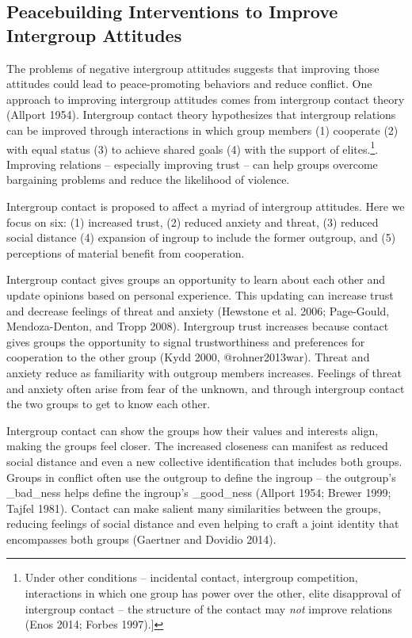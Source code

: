 \documentclass[11pt]{article}
\begin{document}
\hypertarget{peacebuilding-interventions-to-improve-intergroup-attitudes}{%
\subsection{Peacebuilding Interventions to Improve Intergroup
Attitudes}\label{peacebuilding-interventions-to-improve-intergroup-attitudes}}

The problems of negative intergroup attitudes suggests that improving
those attitudes could lead to peace-promoting behaviors and reduce
conflict. One approach to improving intergroup attitudes comes from
intergroup contact theory (Allport 1954). Intergroup contact theory
hypothesizes that intergroup relations can be improved through
interactions in which group members (1) cooperate (2) with equal status
(3) to achieve shared goals (4) with the support of elites.\footnote{Under
  other conditions -- incidental contact, intergroup competition,
  interactions in which one group has power over the other, elite
  disapproval of intergroup contact -- the structure of the contact may
  \emph{not} improve relations (Enos 2014; Forbes 1997).{]}}. Improving
relations -- especially improving trust -- can help groups overcome
bargaining problems and reduce the likelihood of violence.

Intergroup contact is proposed to affect a myriad of intergroup
attitudes. Here we focus on six: (1) increased trust, (2) reduced
anxiety and threat, (3) reduced social distance (4) expansion of ingroup
to include the former outgroup, and (5) perceptions of material benefit
from cooperation.

Intergroup contact gives groups an opportunity to learn about each other
and update opinions based on personal experience. This updating can
increase trust and decrease feelings of threat and anxiety (Hewstone et
al. 2006; Page-Gould, Mendoza-Denton, and Tropp 2008). Intergroup trust
increases because contact gives groups the opportunity to signal
trustworthiness and preferences for cooperation to the other group (Kydd
2000, @rohner2013war). Threat and anxiety reduce as familiarity with
outgroup members increases. Feelings of threat and anxiety often arise
from fear of the unknown, and through intergroup contact the two groups
to get to know each other.

Intergroup contact can show the groups how their values and interests
align, making the groups feel closer. The increased closeness can
manifest as reduced social distance and even a new collective
identification that includes both groups. Groups in conflict often use
the outgroup to define the ingroup -- the outgroup's \_bad\_ness helps
define the ingroup's \_good\_ness (Allport 1954; Brewer 1999; Tajfel
1981). Contact can make salient many similarities between the groups,
reducing feelings of social distance and even helping to craft a joint
identity that encompasses both groups (Gaertner and Dovidio 2014).
\end{document}
